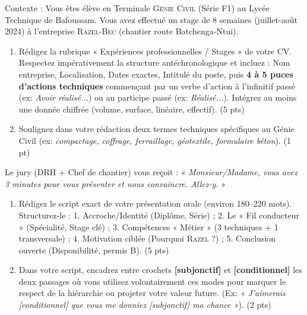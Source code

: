 \documentclass[11pt]{article}
\begin{document}
\begin{exercice}
Contexte : Vous êtes élève en Terminale \textsc{Génie Civil} (Série F1) au Lycée Technique de Bafoussam. Vous avez effectué un stage de 8 semaines (juillet-août 2024) à l'entreprise \textsc{Razel-Bec} (chantier route Batchenga-Ntui).\\

\begin{enumerate}
    \item Rédigez la rubrique « Expériences professionnelles / Stages » de votre CV. Respectez impérativement la structure antéchronologique et incluez : Nom entreprise, Localisation, Dates exactes, Intitulé du poste, puis \textbf{4 à 5 puces d'actions techniques} commençant par un verbe d'action à l'infinitif passé (ex: \textit{Avoir réalisé...}) ou au participe passé (ex: \textit{Réalisé...}). Intégrez au moins une donnée chiffrée (volume, surface, linéaire, effectif). (5 pts)
    \item Soulignez dans votre rédaction deux termes techniques spécifiques au Génie Civil (ex: \textit{compactage, coffrage, ferraillage, géotextile, formulaire béton}). (1 pt)
\end{enumerate}
\end{exercice}

\begin{exercice}
Le jury (DRH + Chef de chantier) vous reçoit : « \emph{Monsieur/Madame, vous avez 3 minutes pour vous présenter et nous convaincre. Allez-y.} »\\

\begin{enumerate}
    \item Rédigez le script exact de votre présentation orale (environ 180--220 mots). Structurez-le : 1. Accroche/Identité (Diplôme, Série) ; 2. Le « Fil conducteur » (Spécialité, Stage clé) ; 3. Compétences « Métier » (3 techniques + 1 transversale) ; 4. Motivation ciblée (Pourquoi \textsc{Razel} ?) ; 5. Conclusion ouverte (Disponibilité, permis B). (5 pts)
    \item Dans votre script, encadrez entre crochets \textbf{[subjonctif]} et \textbf{[conditionnel]} les deux passages où vous utilisez volontairement ces modes pour marquer le respect de la hiérarchie ou projeter votre valeur future. (Ex: \textit{« J'aimerais [conditionnel] que vous me donniez [subjonctif] ma chance »}). (2 pts)
\end{enumerate}
\end{exercice}
\end{document}
